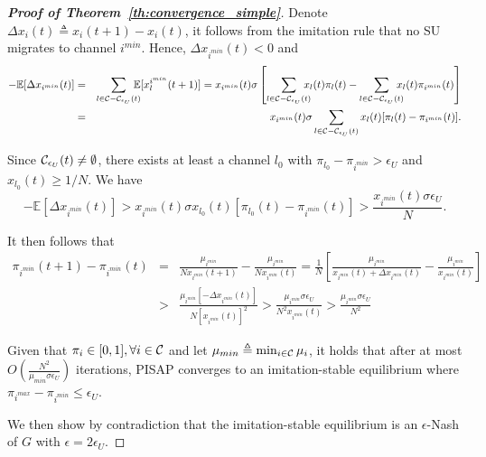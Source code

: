 \documentclass[12pt, onecolumn]{IEEEtran}
\theoremstyle{plain}
\theoremstyle{definition}
\begin{document}
\begin{proof}[\textbf{Proof of Theorem~\ref{th:convergence_simple}}]
Denote $\Delta x_i(t)\triangleq x_i(t+1)-x_i(t)$, it follows from the imitation rule that no SU migrates to channel $i^{min}$. Hence, $\Delta x_{i^{min}}(t)<0$ and
\begin{eqnarray*}
-\mathbb{E}[\Delta x_{i^{min}}(t)]&=&\sum_{l\in{\cal C}-{\cal C}_{\epsilon_U}(t)} \hspace{-0.3cm}\mathbb{E}[x^{i^{min}}_l(t+1)]=x_{i^{min}}(t)\sigma\left[\sum_{l\in{\cal C}-{\cal C}_{\epsilon_U}(t)} \hspace{-0.3cm}x_l(t)\pi_l(t)-\sum_{l\in{\cal C}-{\cal C}_{\epsilon_U}(t)} \hspace{-0.3cm}x_l(t)\pi_{i^{min}}(t)\right] \\
&=& x_{i^{min}}(t)\sigma\sum_{l\in{\cal C}-{\cal C}_{\epsilon_U}(t)} x_l(t)[\pi_l(t)-\pi_{i^{min}}(t)].
\end{eqnarray*}

Since ${\cal C}_{\epsilon_U}(t)\ne\emptyset$, there exists at least a channel $l_0$ with $\pi_{l_0}-\pi_{i^{min}}>\epsilon_U$ and $x_{l_0}(t)\ge 1/N$. We have
\begin{equation}
-\mathbb{E}[\Delta x_{i^{min}}(t)] > x_{i^{min}}(t)\sigma x_{l_0}(t)[\pi_{l_0}(t)-\pi_{i^{min}}(t)]> \frac{x_{i^{min}}(t)\sigma\epsilon_U}{N}.
\label{eq:prove_reasonning}
\end{equation}

It then follows that
\begin{eqnarray*}
\pi_{i^{min}}(t+1)-\pi_{i^{min}}(t) &=& \frac{\mu_{i^{min}}}{Nx_{i^{min}}(t+1)}-\frac{\mu_{i^{min}}}{Nx_{i^{min}}(t)} = \frac{1}{N}\left[\frac{\mu_{i^{min}}}{x_{i^{min}}(t)+\Delta x_{i^{min}}(t)}-\frac{\mu_{i^{min}}}{x_{i^{min}}(t)}\right] \\
                                    & >& \frac{\mu_{i^{min}}[-\Delta x_{i^{min}}(t)]}{N[x_{i^{min}}(t)]^2}>\frac{\mu_{i^{min}}\sigma\epsilon_U}{N^2x_{i^{min}}(t)}>\frac{\mu_{i^{min}}\sigma\epsilon_U}{N^2}
\end{eqnarray*}

Given that $\pi_i\in[0,1], \forall i\in{\cal C}$ and let $\mu_{min}\triangleq \min_{i \in {\cal C}} \mu_i$, it holds that after at most $O(\frac{N^2}{\mu_{min}\sigma\epsilon_U})$ iterations, PISAP converges to an imitation-stable equilibrium where $\pi_{i^{max}}-\pi_{i^{min}}\le\epsilon_U$.

We then show by contradiction that the imitation-stable equilibrium is an $\epsilon$-Nash of $G$ with $\epsilon=2\epsilon_U$.


\end{proof}
\end{document}
